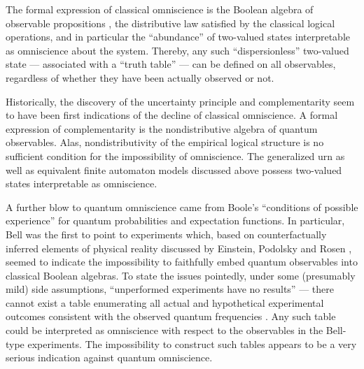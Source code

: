 \documentclass[rmp,amsfonts,showpacs,showkeys]{revtex4}
\begin{document}
The formal expression of classical omniscience is the Boolean algebra of observable propositions
\cite{Boole}, the distributive law satisfied by the classical logical operations,
and in particular the ``abundance'' of two-valued states interpretable
as omniscience about the system.
Thereby, any such ``dispersionless'' two-valued state --- associated with a ``truth table''
--- can be defined on all observables,
regardless of whether they have been actually observed or not.

Historically, the discovery of the uncertainty principle and complementarity
seem to have been first indications of the decline of classical omniscience.
A formal expression of complementarity is the nondistributive algebra of quantum observables.
Alas,
nondistributivity of the empirical logical structure is no sufficient
condition for the impossibility of omniscience.
The generalized urn
as well as equivalent finite automaton models discussed above
possess two-valued states
interpretable as omniscience.

A further blow to quantum omniscience came from Boole's
``conditions of possible experience'' \cite{Boole-62,Pit-94} for quantum probabilities and
expectation functions.
In particular, Bell was the first to point to experiments which,
based on counterfactually inferred elements of physical reality
discussed by Einstein, Podolsky and Rosen \cite{epr},
seemed to indicate the impossibility
to faithfully embed quantum observables into classical Boolean algebras.
To state the issues pointedly, under some (presumably mild) side assumptions,
``unperformed experiments have no results''
\cite{peres222} --- there cannot exist a table enumerating all
actual and hypothetical experimental
outcomes consistent with the observed quantum frequencies \cite{zeilinger-epr-98}.
Any such table could be interpreted as omniscience with respect to
the observables in the Bell-type experiments.
The impossibility to construct such tables appears to be a very serious indication against
quantum omniscience.
\end{document}
